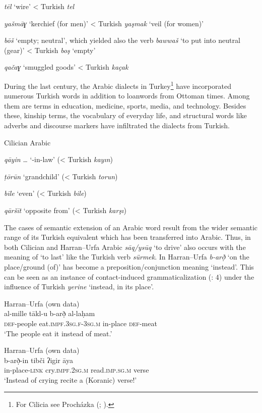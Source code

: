 \documentclass[output=paper]{langsci/langscibook}
\begin{document}
\textit{tēl} ‘wire’ < Turkish \textit{tel}

\textit{yašmāɣ} ‘kerchief (for men)’ < Turkish \textit{yaşmak} ‘veil (for women)’

\textit{bōš} ‘empty; neutral’, which yielded also the verb \textit{bawwaš} ‘to put into neutral (gear)’ < Turkish \textit{boş} ‘empty’

\textit{qačaɣ} ‘smuggled goods’ < Turkish \textit{kaçak}
\z

During the last century, the Arabic dialects in Turkey\footnote{For Cilicia see Procházka (\citeyear{Procházka2002Cukurova}; \citeyear[187--199]{Procházka2002Adana}).} have incorporated numerous Turkish words in addition to loanwords from Ottoman times. Among them are terms in education, medicine, sports, media, and technology. Besides these, kinship terms, the vocabulary of everyday life, and structural words like adverbs and discourse markers have infiltrated the dialects from Turkish. 

\ea
Cilician Arabic

\textit{qāyin} \textit{…} ‘-in-law’ (< Turkish \textit{kayın})

\textit{ṭōrūn} ‘grandchild’ (< Turkish \textit{torun})

\textit{bīle} ‘even’ (< Turkish \textit{bile})

\textit{qāršīt} ‘opposite from’ (< Turkish \textit{karşı})
\z

The cases of semantic extension of an Arabic word result from the wider semantic range of its Turkish equivalent which has been transferred into Arabic. Thus, in both Cilician and Harran--Urfa Arabic \textit{sāq/ysūq} ‘to drive’ also occurs with the meaning of ‘to last’ like the Turkish verb \textit{sürmek}. In Harran--Urfa \textit{b-arð̣} ‘on the place/ground (of)’ has become a preposition/conjunction meaning ‘instead’. This can be seen as an instance of contact-induced grammaticalization (\citealt{GardaniArkadievAmiridze2015}: 4) under the influence of Turkish \textit{yerine} ‘instead, in its place’.

\ea
{Harran--Urfa (own data)}\\
 \gll   al-mille tākl-u b-arð̣ al-laḥam\\
     \textsc{def}{}-people eat.\textsc{impf.3sg.f-3sg.m}  in-place \textsc{def}{}-meat\\
\glt  ‘The people eat it instead of meat.’
\z

\ea 
{Harran--Urfa (own data)}\\
\gll    b-arð̣-in tibči ʔigir āya\\
     in-place-\textsc{link} cry.\textsc{impf.2sg.m} read.\textsc{imp.sg.m} verse\\
\glt ‘Instead of crying recite a (Koranic) verse!’
\z
\end{document}
